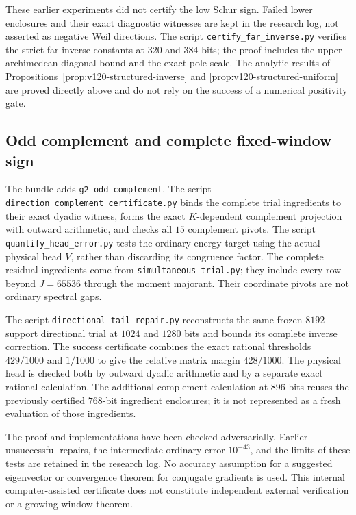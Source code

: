 \documentclass[11pt]{article}
\theoremstyle{remark}
\begin{document}
These earlier experiments did not certify the low Schur sign. Failed
lower enclosures and their exact diagnostic witnesses are kept in the
research log, not asserted as negative Weil directions. The script \texttt{certify\_far\_inverse.py} verifies the
strict far-inverse constants at 320 and 384 bits; the proof includes
the upper archimedean diagonal bound and the exact pole scale.
The analytic
results of Propositions~\ref{prop:v120-structured-inverse} and
\ref{prop:v120-structured-uniform} are proved directly above and
do not rely on the success of a numerical positivity gate.




\subsection{Odd complement and complete fixed-window sign}
\label{app:v126-complement}
The bundle adds \texttt{g2\_odd\_complement}.  The script
\texttt{direction\_complement\_certificate.py} binds the complete
trial ingredients to their exact dyadic witness, forms the exact
$K$-dependent complement projection with outward arithmetic, and
checks all $15$ complement pivots.  The script
\texttt{quantify\_head\_error.py} tests the ordinary-energy target
using the actual physical head $V$, rather than discarding its
congruence factor.  The complete residual ingredients come from
\texttt{simultaneous\_trial.py}; they include every row beyond
$J=65536$ through the moment majorant.  Their coordinate pivots
are not ordinary spectral gaps.

The script \texttt{directional\_tail\_repair.py} reconstructs the
same frozen $8192$-support directional trial at $1024$ and $1280$
bits and bounds its complete inverse correction. The success
certificate combines the exact rational thresholds $429/1000$
and $1/1000$ to give the relative matrix margin $428/1000$.
The physical head is checked both by outward dyadic arithmetic
and by a separate exact rational calculation. The additional
complement calculation at $896$ bits reuses the previously
certified $768$-bit ingredient enclosures; it is not represented
as a fresh evaluation of those ingredients.

The proof and implementations have been checked adversarially.
Earlier unsuccessful repairs, the intermediate ordinary error
$10^{-43}$, and the limits of these tests are retained in the
research log. No accuracy assumption for a suggested eigenvector
or convergence theorem for conjugate gradients is used. This
internal computer-assisted certificate does not constitute
independent external verification or a growing-window theorem.
\end{document}
